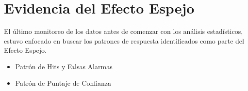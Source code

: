 










\section{Evidencia del Efecto Espejo}

El último monitoreo de los datos antes de comenzar con los análisis estadísticos, estuvo enfocado en buscar los patrones de respuesta identificados como parte del Efecto Espejo. 

\begin{itemize}
\item Patrón de Hits y Falsas Alarmas
\item Patrón de Puntaje de Confianza
\end{itemize}

